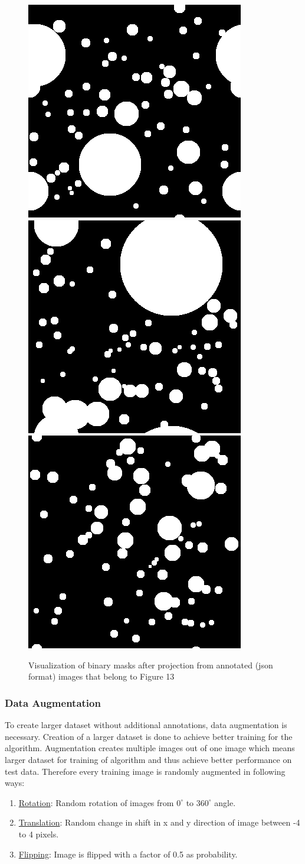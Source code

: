 \documentclass[11pt]{article}
\begin{document}
\begin{figure}[ht!]
	\includegraphics[width=.3\textwidth]{files/annotation/66m.png}\hfill
	\includegraphics[width=.3\textwidth]{files/annotation/29m.png}\hfill
	\includegraphics[width=.3\textwidth]{files/annotation/20m.png}
	\caption{Visualization of binary masks after projection from annotated (json format) images that belong to Figure 13}
	\label{mask}
\end{figure}





\subsubsection{Data Augmentation}
To create larger dataset without additional annotations, data augmentation is necessary. Creation of a larger dataset is done to achieve better training for the algorithm. Augmentation creates multiple images out of one image which means larger dataset for training of algorithm and thus achieve better performance on test data. Therefore every training image is randomly augmented in following ways:

\begin{enumerate}
\item \underline{Rotation}: Random rotation of images from $0^{\circ}$ to $360^{\circ}$ angle.
\item \underline{Translation}: Random change in shift in x and y direction of image between -4 to 4 pixels.
\item \underline{Flipping}: Image is flipped with a factor of 0.5 as probability. 
\end{enumerate}
\end{document}
